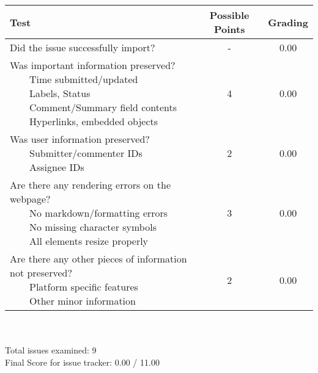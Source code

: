 \documentclass{article}
\newcommand{\tabitem}{~~\llap{\textbullet}~~}
\begin{document}
\begin{adjustbox}{center}
	\renewcommand{\arraystretch}{1.5}
	\begin{tabular}{ p{6cm} | c | c }
		Test & Possible Points & Grading \\ \hline
		Did the issue successfully import? & - & 0.00 \\
		\hline
		\makecell[l]{
			Was important information preserved? \\
			\tabitem Time submitted/updated \\
			\tabitem Labels, Status \\
			\tabitem Comment/Summary field contents \\
			\tabitem Hyperlinks, embedded objects}
		& 4 & 0.00 \\
		\hline
		\makecell[l]{
			Was user information preserved? \\
			\tabitem Submitter/commenter IDs \\
			\tabitem Assignee IDs
		} & 2 & 0.00 \\
		\hline
		\makecell[{{p{6cm}}}]{
			Are there any rendering errors on the webpage? \\
			\tabitem No markdown/formatting errors \\
			\tabitem No missing character symbols \\
			\tabitem All elements resize properly
		} & 3 & 0.00 \\
		\hline
		\makecell[{{p{6cm}}}]{
			Are there any other pieces of information not preserved? \\
			\tabitem Platform specific features \\
			\tabitem Other minor information
		} & 2 & 0.00 \\
	\end{tabular}
\end{adjustbox}
\\
\\Total issues examined: 9\\Final Score for issue tracker: 0.00 / 11.00 \\ \\\begin{adjustbox}{center}
\end{adjustbox}
\end{document}

